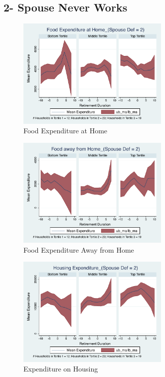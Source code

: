 \documentclass[11pt,onecolumn]{article}
\numberwithin{figure}{section}
\begin{document}
\clearpage

\subsection{2- Spouse Never Works}

\begin{figure}[h]
	\caption{Food Expenditure at Home}
	\centering
	\includegraphics[width=0.65\textwidth]{../ConsumptionPostRetirement_by_SpouseDef_Cats/Smoothed/2/spouse_def_total_foodexp_home_real.pdf}
\end{figure}


\begin{figure}[h]
	\caption{Food Expenditure Away from Home}
	\centering
	\includegraphics[width=0.65\textwidth]{../ConsumptionPostRetirement_by_SpouseDef_Cats/Smoothed/2/spouse_def_total_foodexp_away_real.pdf}
\end{figure}

\clearpage

\begin{figure}[h]
	\caption{Expenditure on Housing}
	\centering
	\includegraphics[width=0.65\textwidth]{../ConsumptionPostRetirement_by_SpouseDef_Cats/Smoothed/2/spouse_def_total_housing_real.pdf}
\end{figure}
\end{document}
